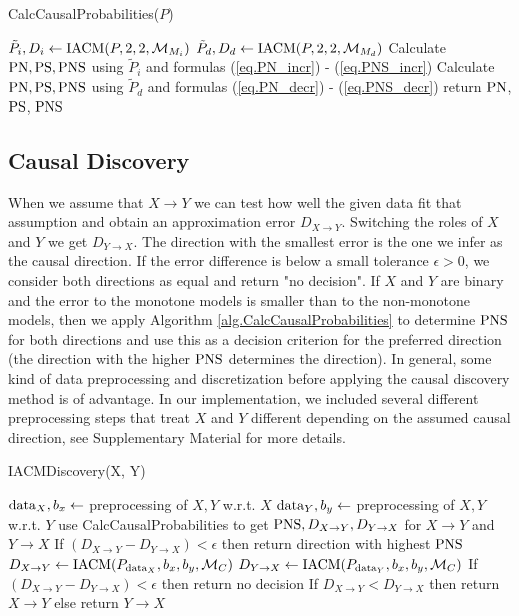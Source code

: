 \documentclass[letterpaper]{article}
\newcommand{\kM}{\mathcal{M}}   %
\newcommand{\PN}{{\rm PN}}
\newcommand{\PS}{{\rm PS}}
\newcommand{\PNS}{{\rm PNS}}
\begin{document}
\begin{algorithm}[h]
\caption{CalcCausalProbabilities($P$)}
\label{alg.CalcCausalProbabilities}
\begin{algorithmic}[1]
\State $\tilde P_{i},  D_{i} \gets {\rm IACM}(P, 2, 2, \kM_{M_i})$
\State $\tilde P_{d},  D_{d} \gets {\rm IACM}(P, 2, 2, \kM_{M_d})$
	\State Calculate $\PN, \PS, \PNS$ using $\tilde P_i$ and formulas (\ref{eq.PN_incr}) - (\ref{eq.PNS_incr})
\Else
	\State Calculate $\PN, \PS, \PNS$ using $\tilde P_d$ and formulas (\ref{eq.PN_decr}) - (\ref{eq.PNS_decr})
\EndIf
\State return $\PN$, $\PS$, $\PNS$
\end{algorithmic}
\end{algorithm}

\subsection{Causal Discovery}

When we assume that $X \rightarrow Y$ we can test how well the given data fit that assumption and obtain an approximation error $D_{X\rightarrow Y}$. Switching the roles of $X$ and $Y$ we get $D_{Y \rightarrow X}$. The direction with the smallest error is the one we infer as the causal direction. If the error difference is below a small tolerance $\epsilon>0$, we consider both directions as equal and return "no decision". If $X$ and $Y$ are binary and the error to the monotone models is smaller than to the non-monotone models, then we apply Algorithm \ref{alg.CalcCausalProbabilities} to determine $\PNS$ for both directions and use this as a decision criterion for the preferred direction (the direction with the higher $\PNS$ determines the direction). In general, some kind of data preprocessing and discretization before applying the causal discovery method is of advantage. In our implementation, we included several different preprocessing steps that treat $X$ and $Y$ different depending on the assumed causal direction, see Supplementary Material for more details.

\begin{algorithm}
\caption{IACMDiscovery(X, Y)}
\label{alg.iacmdiscovery}
\begin{algorithmic}[1]
\State ${\rm data}_X, b_x \gets$ preprocessing of $X, Y$ w.r.t. $X$
\State ${\rm data}_Y, b_y \gets$ preprocessing of $X, Y$ w.r.t. $Y$
	\State use CalcCausalProbabilities to get ${\rm PNS}, D_{X \rightarrow Y}, D_{Y \rightarrow X}$ for $X\rightarrow Y$ and $Y \rightarrow X$
	\State If $(D_{X \rightarrow Y} - D_{Y \rightarrow X})<\epsilon$ then return direction with highest ${\rm PNS}$
\Else
	\State $D_{X \rightarrow Y} \gets {\rm IACM}(P_{{\rm data}_X}, b_x, b_y, \kM_C)$
	\State $D_{Y \rightarrow X} \gets {\rm IACM}(P_{{\rm data}_Y}, b_x, b_y, \kM_C)$
	\State If $(D_{X \rightarrow Y} - D_{Y \rightarrow X})<\epsilon$ then return no decision
\EndIf
\State If $D_{X \rightarrow Y} < D_{Y \rightarrow X}$ then return $X\rightarrow Y$  else return $Y\rightarrow X$
\end{algorithmic}
\end{algorithm}
\end{document}
